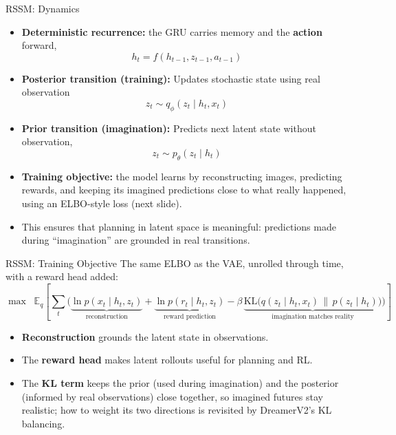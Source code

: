 \begin{frame}[t]{RSSM: Dynamics}
  \begin{itemize}
    \item \textbf{Deterministic recurrence:} the GRU carries memory and the \textbf{action} forward,
    \[ h_t = f(h_{t-1}, z_{t-1}, a_{t-1}) \]
    \item \textbf{Posterior transition (training):} Updates stochastic state using real observation
    \[ z_t \sim q_\phi(z_t \mid h_t, x_t) \]
    \item \textbf{Prior transition (imagination):} Predicts next latent state without observation,
    \[ z_t \sim p_\theta(z_t \mid h_t) \]
    \item \textbf{Training objective:} the model learns by reconstructing images, predicting rewards, and keeping its imagined predictions close to what really happened, using an ELBO-style loss (next slide).
    \item This ensures that planning in latent space is meaningful: predictions made during ``imagination'' are grounded in real transitions.
  \end{itemize}
\end{frame}

\begin{frame}[t]{RSSM: Training Objective}
  The same ELBO as the VAE, unrolled through time, with a reward head added:
  \begin{equation*}
    \max \;\; \mathbb{E}_{q}\!\left[\sum_t \Big(
      \underbrace{\ln p(x_t \mid h_t, z_t)}_{\text{reconstruction}}
      + \underbrace{\ln p(r_t \mid h_t, z_t)}_{\text{reward prediction}}
      - \beta\, \underbrace{\mathrm{KL}\!\big(q(z_t \mid h_t, x_t)\,\|\,p(z_t \mid h_t)\big)}_{\text{imagination matches reality}}
    \Big)\right]
  \end{equation*}
  \begin{itemize}\itemsep0.25em
    \item \textbf{Reconstruction} grounds the latent state in observations.
    \item The \textbf{reward head} makes latent rollouts useful for planning and RL.
    \item The \textbf{KL term} keeps the prior (used during imagination) and the posterior (informed by real observations) close together, so imagined futures stay realistic; how to weight its two directions is revisited by DreamerV2's KL balancing.
  \end{itemize}
\end{frame}

